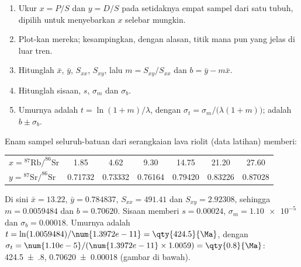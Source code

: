 \begin{method}\label{met:b1:radiometric-methods:isochron}
\begin{enumerate}
  \item Ukur $x = P/S$ dan $y = D/S$ pada setidaknya empat sampel dari satu tubuh, dipilih untuk menyebarkan $x$ selebar mungkin.
  \item Plot-kan mereka; kesampingkan, dengan alasan, titik mana pun yang jelas di luar tren.
  \item Hitunglah $\bar x$, $\bar y$, $S_{xx}$, $S_{xy}$, lalu $m = S_{xy}/S_{xx}$ dan $b = \bar y - m \bar x$.
  \item Hitunglah sisaan, $s$, $\sigma_m$ dan $\sigma_b$.
  \item Umurnya adalah $t = \ln(1+m)/\lambda$, dengan $\sigma_t =
        \sigma_m/\bigl(\lambda(1+m)\bigr)$;  adalah $b \pm \sigma_b$.
\end{enumerate}
\end{method}

\begin{example}\label{ex:b1:radiometric-methods:rhyolite}
Enam sampel seluruh-batuan dari serangkaian lava riolit (data latihan) memberi:
\begin{center}
\small
\begin{tabular}{|l|cccccc|}
\hline
$x = {}^{87}\mathrm{Rb}/^{86}\mathrm{Sr}$ & 1.85 & 4.62 & 9.30 & 14.75 & 21.20 & 27.60 \\
$y = {}^{87}\mathrm{Sr}/^{86}\mathrm{Sr}$ & 0.71732 & 0.73332 & 0.76164 & 0.79420 & 0.83226 & 0.87028 \\
\hline
\end{tabular}
\end{center}
Di sini $\bar x = 13.22$, $\bar y = 0.784837$, $S_{xx} = 491.41$ dan $S_{xy} = 2.92308$, sehingga $m = 0.0059484$ dan $b = 0.70620$. Sisaan memberi $s = 0.00024$, $\sigma_m = \num{1.10e-5}$ dan $\sigma_b = 0.00018$. Umurnya adalah $t = \ln(1.0059484)/\num{1.3972e-11} = \qty{424.5}{\Ma}$, dengan $\sigma_t = \num{1.10e-5}/(\num{1.3972e-11} \times 1.0059) = \qty{0.8}{\Ma}$: \qty[uncertainty-mode=separate]{424.5(8)}{\Ma},  \num[uncertainty-mode=separate]{0.70620(18)} (gambar di bawah).
\end{example}

